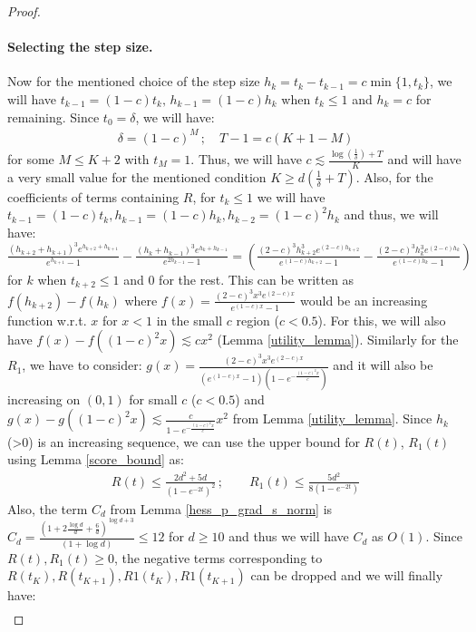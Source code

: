 \documentclass{article}
\begin{document}
\begin{proof}
\paragraph{Selecting the step size.} Now for the mentioned choice of the step size $h_k=t_k-t_{k-1}=c\min\{1,t_k\}$, we will have $t_{k-1}=(1-c)t_k,\, h_{k-1}=(1-c)h_{k}$ when $t_k\leq 1$ and $h_k=c$ for remaining. Since $t_0=\delta$, we will have:
    \begin{align*}
        \delta = (1-c)^M \, ; \quad T-1 = c(K+1-M)
    \end{align*}
    for some $M \leq K+2$  with $t_M=1$. Thus, we will have $c \lesssim \frac{\log\left(\frac{1}{\delta}\right) +T}{K}$ and will have a very small value for the mentioned condition $K \geq d(\frac{1}{\delta} + T)$. Also, for the coefficients of terms containing $R$, for $t_k\leq 1$ we will have $t_{k-1}=(1-c){t_k}, h_{k-1}=(1-c)h_k, h_{k-2}=(1-c)^2h_{k}$ and thus, we will have: \\ $\frac{(h_{k+2}+h_{k+1})^3e^{h_{k+2}+h_{k+1}}}{e^{h_{k+1}}-1}-\frac{(h_k+h_{k-1})^3e^{h_k+h_{k-1}}}{e^{2h_{k-1}}-1} = \left(\frac{(2-c)^3h^3_{k+2}e^{(2-c)h_{k+2}}}{e^{(1-c)h_{k+2}}-1}-\frac{(2-c)^3h^3_{k}e^{(2-c)h_k}}{e^{(1-c)h_{k}}-1}\right)$ for $k$ when $t_{k+2}\leq 1$ and $0$ for the rest. This can be written as $f(h_{k+2})-f({h_k})$ where $f(x)=\frac{(2-c)^3x^3e^{(2-c)x}}{e^{({1-c})x}-1}$ would be an increasing function w.r.t. $x$ for $x<1$ in the small $c$ region ($c<0.5$). For this, we will also have $f(x)-f((1-c)^2x) \lesssim cx^2$ (Lemma \ref{utility_lemma}). Similarly for the $R_1$, we have to consider:
    $g(x)= \frac{(2-c)^3x^3e^{(2-c)x}}{(e^{(1-c)x}-1)\left(1-e^{-\frac{(1-c)^2x}{c}}\right)}$ and it will also be increasing on  $(0,1)$ for small $c$ ($c<0.5$) and $g(x)-g((1-c)^2x) \lesssim \frac{c}{1-e^{-\frac{(1-c)^2x}{c}}}x^2$ from Lemma \ref{utility_lemma}.
    Since $h_k$(>0) is an increasing sequence, we can use the upper bound for $R(t)$, $R_1(t)$ using Lemma \ref{score_bound} as:
\begin{align*}
    R(t) \leq \frac{2d^2+5d}{(1-e^{-2t})^2} \, ; \qquad  R_1(t) \leq  \frac{5d^2}{8(1-e^{-2t})}
\end{align*}
Also, the term $C_d$ from Lemma \ref{hess_p_grad_s_norm} is $C_d =\frac{(1+2\frac{\log d}{d}+\frac{6}{d})^{\log d+3}}{(1+\log d)} \leq 12$ for $d\geq 10$ and thus we will have $C_d$ as $O(1)$.
Since $R(t),R_1(t)\geq 0$, the negative terms corresponding to $R({t_{K}}), R(t_{K+1}), R1({t_{K}}), R1(t_{K+1})$ can be dropped and we will finally have:
    \begin{align*}

\end{align*}
\end{proof}
\end{document}
